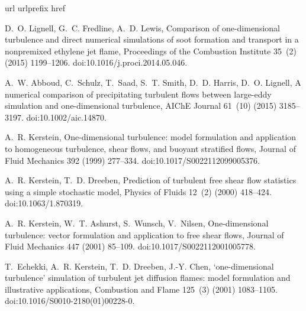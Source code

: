 \documentclass[preprint,12pt, a4paper]{elsarticle}
\begin{document}
\begin{thebibliography}{10}
\expandafter\ifx\csname url\endcsname\relax
  \def\url#1{\texttt{#1}}\fi
\expandafter\ifx\csname urlprefix\endcsname\relax\def\urlprefix{URL }\fi
\expandafter\ifx\csname href\endcsname\relax
  \def\href#1#2{#2} \def\path#1{#1}\fi

D.~O. Lignell, G.~C. Fredline, A.~D. Lewis, Comparison of one-dimensional
  turbulence and direct numerical simulations of soot formation and transport
  in a nonpremixed ethylene jet flame, Proceedings of the Combustion Institute
  35~(2) (2015) 1199--1206.
\newblock \href {http://dx.doi.org/10.1016/j.proci.2014.05.046}
  {\path{doi:10.1016/j.proci.2014.05.046}}.

A.~W. Abboud, C.~Schulz, T.~Saad, S.~T. Smith, D.~D. Harris, D.~O. Lignell, A
  numerical comparison of precipitating turbulent flows between large-eddy
  simulation and one-dimensional turbulence, AIChE Journal 61~(10) (2015)
  3185--3197.
\newblock \href {http://dx.doi.org/10.1002/aic.14870}
  {\path{doi:10.1002/aic.14870}}.

A.~R. Kerstein, One-dimensional turbulence: model formulation and application
  to homogeneous turbulence, shear flows, and buoyant stratified flows, Journal
  of Fluid Mechanics 392 (1999) 277--334.
\newblock \href {http://dx.doi.org/10.1017/S0022112099005376}
  {\path{doi:10.1017/S0022112099005376}}.

A.~R. Kerstein, T.~D. Dreeben, Prediction of turbulent free shear flow
  statistics using a simple stochastic model, Physics of Fluids 12~(2) (2000)
  418--424.
\newblock \href {http://dx.doi.org/10.1063/1.870319}
  {\path{doi:10.1063/1.870319}}.

A.~R. Kerstein, W.~T. Ashurst, S.~Wunsch, V.~Nilsen, One-dimensional
  turbulence: vector formulation and application to free shear flows, Journal
  of Fluid Mechanics 447 (2001) 85--109.
\newblock \href {http://dx.doi.org/10.1017/S0022112001005778}
  {\path{doi:10.1017/S0022112001005778}}.

T.~Echekki, A.~R. Kerstein, T.~D. Dreeben, J.-Y. Chen, `one-dimensional
  turbulence' simulation of turbulent jet diffusion flames: model formulation
  and illustrative applications, Combustion and Flame 125~(3) (2001)
  1083--1105.
\newblock \href {http://dx.doi.org/10.1016/S0010-2180(01)00228-0}
  {\path{doi:10.1016/S0010-2180(01)00228-0}}.


\end{thebibliography}
\end{document}
